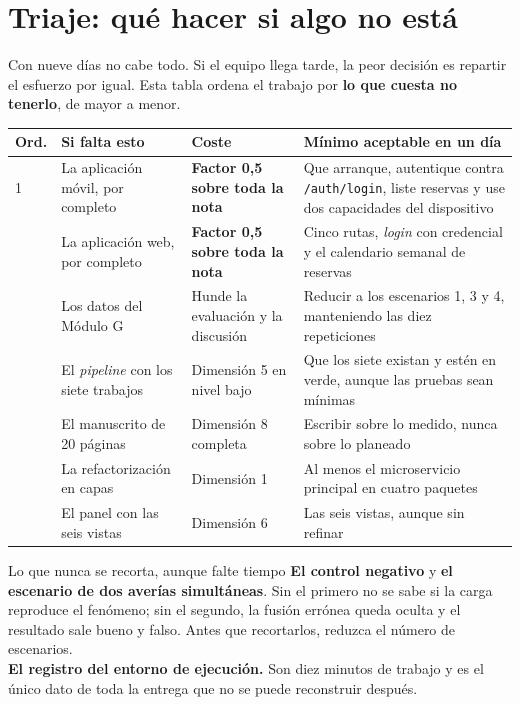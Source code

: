 \documentclass[11pt,a4paper]{article}
\begin{document}
\section{Triaje: qué hacer si algo no está}

Con nueve días no cabe todo. Si el equipo llega tarde, la peor decisión es repartir el esfuerzo por igual. Esta tabla ordena el trabajo por \textbf{lo que cuesta no tenerlo}, de mayor a menor.

\begin{center}
	\small
	\begin{longtable}{@{}p{0.9cm}p{5.4cm}p{3.0cm}p{5.0cm}@{}}
		\toprule
		\textbf{Ord.} & \textbf{Si falta esto} & \textbf{Coste} & \textbf{Mínimo aceptable en un día} \\
		\midrule
		\endhead
		1 & La aplicación móvil, por completo & \textbf{Factor 0,5 sobre toda la nota} & Que arranque, autentique contra \texttt{/auth/login}, liste reservas y use dos capacidades del dispositivo \\
		\addlinespace
		2 & La aplicación web, por completo & \textbf{Factor 0,5 sobre toda la nota} & Cinco rutas, \emph{login} con credencial y el calendario semanal de reservas \\
		\addlinespace
		3 & Los datos del Módulo G & Hunde la evaluación y la discusión & Reducir a los escenarios 1, 3 y 4, manteniendo las diez repeticiones \\
		\addlinespace
		4 & El \emph{pipeline} con los siete trabajos & Dimensión 5 en nivel bajo & Que los siete existan y estén en verde, aunque las pruebas sean mínimas \\
		\addlinespace
		5 & El manuscrito de 20 páginas & Dimensión 8 completa & Escribir sobre lo medido, nunca sobre lo planeado \\
		\addlinespace
		6 & La refactorización en capas & Dimensión 1 & Al menos el microservicio principal en cuatro paquetes \\
		\addlinespace
		7 & El panel con las seis vistas & Dimensión 6 & Las seis vistas, aunque sin refinar \\
		\bottomrule
	\end{longtable}
\end{center}

\begin{pisoBox}{Lo que nunca se recorta, aunque falte tiempo}
	\textbf{El control negativo} y \textbf{el escenario de dos averías simultáneas}. Sin el primero no se sabe si la carga reproduce el fenómeno; sin el segundo, la fusión errónea queda oculta y el resultado sale bueno y falso. Antes que recortarlos, reduzca el número de escenarios.\\[5pt]
	\textbf{El registro del entorno de ejecución.} Son diez minutos de trabajo y es el único dato de toda la entrega que no se puede reconstruir después.
\end{pisoBox}
\end{document}
